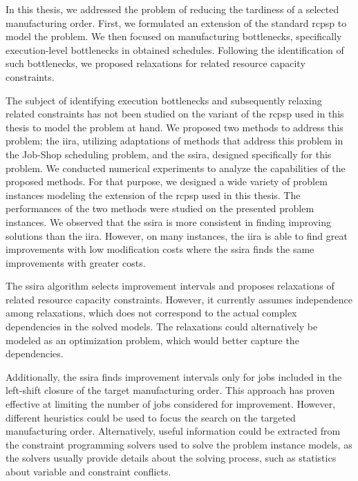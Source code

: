  \label{chap:conclussion}

In this thesis, we addressed the problem of reducing the tardiness of a selected manufacturing order.
First, we formulated an extension of the standard \ac{rcpsp} to model the problem.
We then focused on manufacturing bottlenecks,
specifically execution-level bottlenecks in obtained schedules.
Following the identification of such bottlenecks,
we proposed relaxations for related resource capacity constraints.


The subject of identifying execution bottlenecks and subsequently relaxing related constraints
has not been studied on the variant of the \acs{rcpsp} used in this thesis to model the problem at hand.
We proposed two methods to address this problem;
the \ac{iira}, utilizing adaptations of methods
that address this problem in the Job-Shop scheduling problem,
and the \ac{ssira}, designed specifically for this problem.
We conducted numerical experiments to analyze the capabilities of the proposed methods.
For that purpose, we designed a wide variety of problem instances
modeling the extension of the \ac{rcpsp} used in this thesis.
The performances of the two methods were studied on the presented problem instances.
We observed that the \ac{ssira} is more consistent in finding improving solutions than the \ac{iira}.
However, on many instances, the \ac{iira} is able to find great improvements with low modification costs
where the \ac{ssira} finds the same improvements with greater costs.


The \ac{ssira} algorithm selects improvement intervals
and proposes relaxations of related resource capacity constraints.
However, it currently assumes independence among relaxations,
which does not correspond to the actual complex dependencies in the solved models.
The relaxations could alternatively be modeled as an optimization problem,
which would better capture the dependencies.

Additionally, the \ac{ssira} finds improvement intervals only for jobs
included in the left-shift closure of the target manufacturing order.
This approach has proven effective at limiting the number of jobs considered for improvement.
However, different heuristics could be used to focus the search on the targeted manufacturing order.
Alternatively, useful information could be extracted from the constraint programming solvers
used to solve the problem instance models,
as the solvers usually provide details about the solving process,
such as statistics about variable and constraint conflicts.

